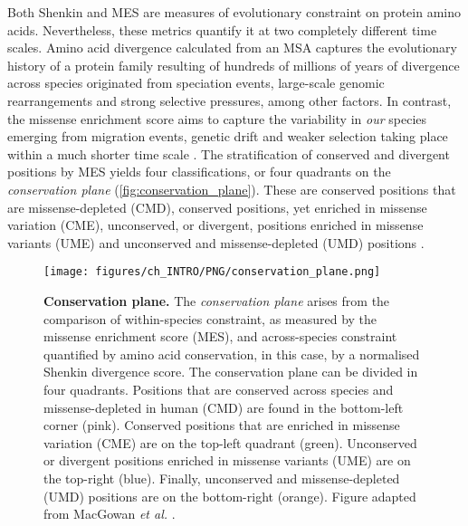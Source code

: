 Both Shenkin and MES are measures of evolutionary constraint on protein amino acids. Nevertheless, these metrics quantify it at two completely different time scales. Amino acid divergence calculated from an MSA captures the evolutionary history of a protein family resulting of hundreds of millions of years of divergence across species originated from speciation events, large-scale genomic rearrangements and strong selective pressures, among other factors. In contrast, the missense enrichment score aims to capture the variability in \textit{our} species emerging from migration events, genetic drift and weaker selection taking place within a much shorter time scale \cite{HUBLIN_2017_HUMAN}. The stratification of conserved and divergent positions by MES yields four classifications, or four quadrants on the \textit{conservation plane} (\autoref{fig:conservation_plane}). These are conserved positions that are missense-depleted (CMD), conserved positions, yet enriched in missense variation (CME), unconserved, or divergent, positions enriched in missense variants (UME) and unconserved and missense-depleted (UMD) positions \cite{MACGOWAN_2024_VARIANTS}.

\begin{figure}[htb!]
    \centering
    \texttt{[image: figures/ch\_INTRO/PNG/conservation\_plane.png]}
    \caption[Conservation plane]{\textbf{Conservation plane.} The \textit{conservation plane} arises from the comparison of within-species constraint, as measured by the missense enrichment score (MES), and across-species constraint quantified by amino acid conservation, in this case, by a normalised Shenkin divergence score. The conservation plane can be divided in four quadrants. Positions that are conserved across species and missense-depleted in human (CMD) are found in the bottom-left corner (pink). Conserved positions that are enriched in missense variation (CME) are on the top-left quadrant (green). Unconserved or divergent positions enriched in missense variants (UME) are on the top-right (blue). Finally, unconserved and missense-depleted (UMD) positions are on the bottom-right (orange). Figure adapted from MacGowan \textit{et al.} \cite{MACGOWAN_2024_VARIANTS}.}
    \label{fig:conservation_plane}
\end{figure}


